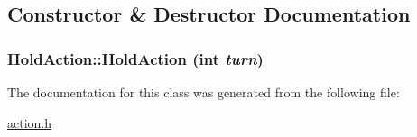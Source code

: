 \subsection{Constructor \& Destructor Documentation}
\hypertarget{classHoldAction_4af274044f62732dc5ffbb60d021e8ec}{
\subsubsection[{HoldAction}]{\setlength{\rightskip}{0pt plus 5cm}HoldAction::HoldAction (int {\em turn})}}
\label{classHoldAction_4af274044f62732dc5ffbb60d021e8ec}




The documentation for this class was generated from the following file:\begin{CompactItemize}
\item 
\hyperlink{action_8h}{action.h}\end{CompactItemize}
